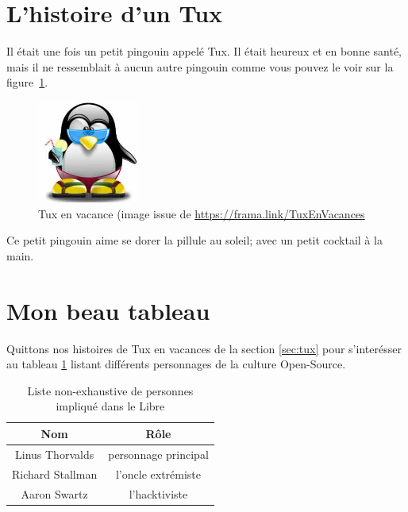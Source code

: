 \documentclass[a4paper, 12pt]{article}
\begin{document}
\section{L'histoire d'un Tux \label{sec:tux}}
Il était une fois un petit pingouin appelé Tux.  Il était heureux et en bonne santé, mais il ne ressemblait à aucun autre pingouin comme vous pouvez le voir sur la figure~\ref{fig:tux}.
\begin{figure}
\centering
\includegraphics[width=0.3\textwidth]{tux.jpeg}
\caption{Tux en vacance (image issue de \url{https://frama.link/TuxEnVacances}}
\label{fig:tux}
\end{figure}
Ce petit pingouin aime se dorer la pillule au soleil; avec un petit cocktail à la main.

\section{Mon beau tableau}
Quittons nos histoires de Tux en vacances de la section \ref{sec:tux} pour s'interésser au tableau \ref{tab:Linux} listant différents personnages de la culture Open-Source.
\begin{table}
\centering
\begin{tabular}{|c||c|}
\hline
Nom & Rôle \\
\hline
\hline
Linus Thorvalds & personnage principal \\
\hline
Richard Stallman & l'oncle extrémiste \\
\hline
Aaron Swartz & l'hacktiviste \\
\hline
\end{tabular}
\caption{Liste non-exhaustive de personnes impliqué dans le Libre}
\label{tab:Linux}
\end{table}
\end{document}
